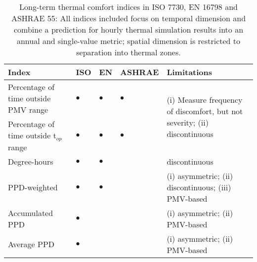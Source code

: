 \begin{table}[!h]
\centering
\footnotesize
    \caption{Long-term thermal comfort indices in ISO 7730, EN 16798 and ASHRAE 55: All indices included focus on temporal dimension and combine a prediction for hourly thermal simulation results into an annual and single-value metric; spatial dimension is restricted to separation into thermal zones.}
        \label{tab:comfort-indices}
        \renewcommand{\arraystretch}{1.75}
        
            \begin{tabular}{ m{3cm} m{0.75cm} m{0.75cm} m{1.25cm} m{4cm} }

            \textbf{Index} & ISO\newline7730 & EN\newline16798 & ASHRAE\newline55 & \textbf{Limitations} \\
        
            \hline

            Percentage of time outside PMV range & $\bullet$ & $\bullet$ & $\bullet$ & \multirow[t]{2}{4cm}{(i) Measure frequency of discomfort, but not severity; (ii) discontinuous } \\


            Percentage of time outside t$_{op}$ range & $\bullet$ & $\bullet$ & $\bullet$ & {} \\

            \hline

            Degree-hours & $\bullet$ & $\bullet$ & {} & {discontinuous} \\


            PPD-weighted & $\bullet$ & $\bullet$ & {} & {(i) asymmetric; (ii) discontinuous; (iii) PMV-based} \\


            Accumulated PPD & $\bullet$ & {} & {} & {(i) asymmetric; (ii) PMV-based} \\

            \hline

            Average PPD & $\bullet$ & {} & {} & {(i) asymmetric; (ii) PMV-based} \\
            
            \end{tabular}


\end{table}
